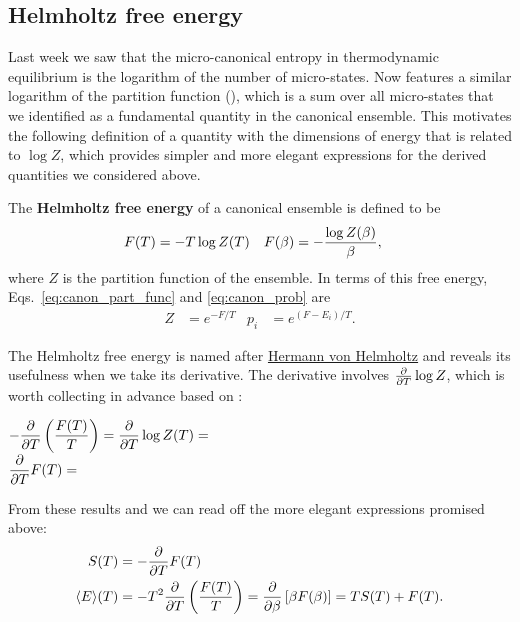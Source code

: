 \subsection{\label{sec:Helmholtz}Helmholtz free energy}
Last week we saw that the micro-canonical entropy in thermodynamic equilibrium is the logarithm of the number of micro-states.
Now  features a similar logarithm of the partition function (), which is a sum over all micro-states that we identified as a fundamental quantity in the canonical ensemble.
This motivates the following definition of a quantity with the dimensions of energy that is related to $\log Z$, which provides simpler and more elegant expressions for the derived quantities we considered above.

\begin{shaded}
  The \textbf{Helmholtz free energy} of a canonical ensemble is defined to be
  \begin{align}
    \label{eq:helmholtz}
    F(T) & = -T \log Z(T) &
    F(\beta) & = -\frac{\log Z(\beta)}{\beta},
  \end{align}
  where $Z$ is the partition function of the ensemble.
  In terms of this free energy, Eqs.~\ref{eq:canon_part_func} and \ref{eq:canon_prob} are
  \begin{align*}
    Z & = e^{-F / T} &
    p_i & = e^{(F - E_i) / T}.
  \end{align*}
\end{shaded}

\newpage %
The Helmholtz free energy is named after \href{https://en.wikipedia.org/wiki/Hermann_von_Helmholtz}{Hermann von Helmholtz} and reveals its usefulness when we take its derivative.
The derivative involves $\frac{\partial }{\partial T} \log Z$, which is worth collecting in advance based on :
\begin{mdframed}
  $\displaystyle -\frac{\partial }{\partial T}\left(\frac{F(T)}{T}\right) = \frac{\partial }{\partial T} \log Z(T) = $ \\[50 pt]
  $\displaystyle \frac{\partial }{\partial T} F(T) = $ \\[50 pt]
\end{mdframed}
From these results and  we can read off the more elegant expressions promised above:
\begin{align}
  S(T) & = -\frac{\partial }{\partial T} F(T) \label{eq:canon_entropy-F} \\
  \left\langle E \right\rangle\!(T) & = -T^2 \frac{\partial }{\partial T}\left(\frac{F(T)}{T}\right) = \frac{\partial }{\partial \beta}\left[\beta F(\beta)\right] = T S(T) + F(T). \label{eq:canon_energy-F}
\end{align}




